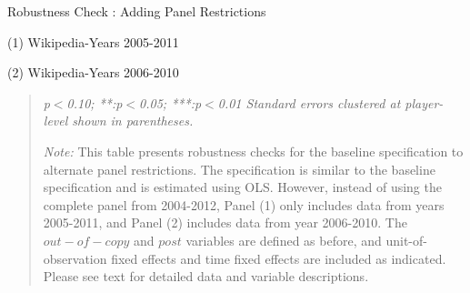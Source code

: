 \begin{center}
\begin{table}[!htbp]

\caption{Robustness Check : Adding Panel Restrictions}
\vspace{5mm}
\caption*{(1) Wikipedia-Years 2005-2011}
%

\vspace{5mm}
\caption*{(2) Wikipedia-Years 2006-2010}

%
\begin{quote}
\vspace{5mm}

\emph{p$<$0.10; **:p$<$0.05; ***:p$<$0.01 
\newline
Standard errors clustered at player-level shown in parentheses.}

\vspace{5mm}

\emph{Note:} This table presents robustness checks for the baseline specification to alternate panel restrictions. The specification is similar to the baseline specification and is estimated using OLS. However, instead of using the complete panel from 2004-2012, Panel (1) only includes data from years 2005-2011, and Panel (2) includes data from year 2006-2010. The $out-of-copy$ and $post$ variables are defined as before, and unit-of-observation fixed effects and time fixed effects are included as indicated. Please see text for detailed data and variable descriptions. 
\end{quote}
\label{tab:short_timeline}
\end{table}
\end{center}



